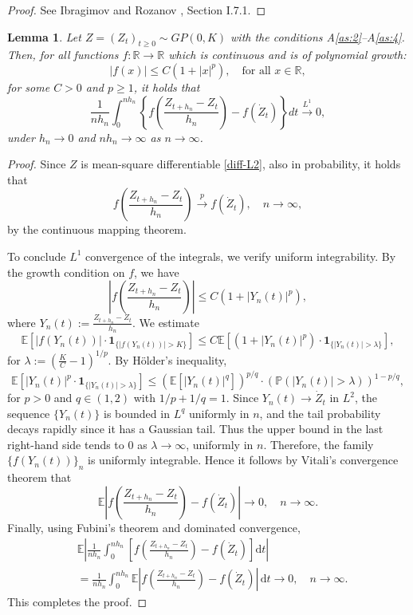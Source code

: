 \documentclass[a4paper,10pt,twoside]{article}
\newtheorem{lem}{Lemma}[section]
\numberwithin{equation}{section}
\def\l{\left}
\def\r{\right}
\def\toP{\stackrel{p}{\longrightarrow}}
\def\E{\mathbb{E}}
\def\df{\mathrm{d}}
\begin{document}
\begin{proof}
See Ibragimov and Rozanov \cite{ir78}, Section I.7.1.
\end{proof}

\begin{lem}\label{lem:approx-integral}
Let $Z = (Z_t)_{t \ge 0} \sim GP(0,K)$ with the conditions A\ref{as:2}--A\ref{as:4}. 
Then, for all functions $f:\mathbb{R} \to \mathbb{R}$ which is continuous and is of polynomial growth:
\[
|f(x)| \le C(1 + |x|^p), \quad \text{for all } x \in \mathbb{R},
\]
for some $C>0$ and $p \ge 1$, it holds that 
\[
\frac{1}{nh_n} \int_0^{nh_n} \l\{ f\l( \frac{Z_{t+h_n} - Z_t}{h_n} \r) - f(\dot{Z}_t) \r\} dt \stackrel{L^1}{\longrightarrow} 0, 
\]
under $h_n \to 0$ and $nh_n \to \infty$ as $n\to \infty$. 
\end{lem}

\begin{proof}
Since $Z$ is mean-square differentiable \eqref{diff-L2}, also in probability,  it holds that 
\[
f\l( \frac{Z_{t+h_n} - Z_t}{h_n} \r) \toP f(\dot{Z}_t),\quad n\to \infty, 
\]
by the continuous mapping theorem. 

To conclude $L^1$ convergence of the integrals, we verify uniform integrability. By the growth condition on $f$, we have
\[
\l| f\l( \frac{Z_{t+h_n} - Z_t}{h_n} \r) \r| \le C(1 + |Y_n(t)|^p),
\]
where $Y_n(t) := \frac{Z_{t+h_n} - Z_t}{h_n}$. We estimate
\[
\E\l[ |f(Y_n(t))| \cdot \mathbf{1}_{\{ |f(Y_n(t))| > K \}} \r]
\le C \E\l[ (1 + |Y_n(t)|^p) \cdot \mathbf{1}_{\{ |Y_n(t)| > \lambda \}} \r],
\]
for $\lambda := \l( \frac{K}{C} - 1 \r)^{1/p}$. By H\"older's inequality,
\[
\E[|Y_n(t)|^p \cdot \mathbf{1}_{\{ |Y_n(t)| > \lambda \}}]
\le \l( \E[|Y_n(t)|^q] \r)^{p/q} \cdot \l( \mathbb{P}(|Y_n(t)| > \lambda) \r)^{1 - p/q}, 
\]
for $p>0$ and $q\in (1,2)$ with $1/p + 1/q=1$. 
Since $Y_n(t) \to \dot{Z}_t$ in $L^2$, the sequence $\{Y_n(t)\}$ is bounded in $L^q$ uniformly in $n$, and the tail probability decays rapidly since it has a Gaussian tail. 
Thus the upper bound in the last right-hand side tends to $0$ as $\lambda \to \infty$, uniformly in $n$. Therefore, the family $\{ f(Y_n(t)) \}_n$ is uniformly integrable.
Hence it follows by Vitali's convergence theorem that 
\[
\E\l| f\l( \frac{Z_{t+h_n} - Z_t}{h_n} \r) - f(\dot{Z}_t) \r|\to  0,\quad n\to \infty. 
\]
Finally, using Fubini's theorem and dominated convergence,
\begin{align*}
&\E \l|\frac{1}{nh_n} \int_0^{nh_n}\l[ f\l( \frac{Z_{t+h_n} - Z_t}{h_n} \r) - f(\dot{Z}_t) \r] \df t \r| \\
&= \frac{1}{nh_n} \int_0^{nh_n}\E \l| f\l( \frac{Z_{t+h_n} - Z_t}{h_n} \r) - f(\dot{Z}_t) \r|\,\df t \to 0,\quad n\to \infty. 
\end{align*}
This completes the proof. 
\end{proof}
\end{document}
